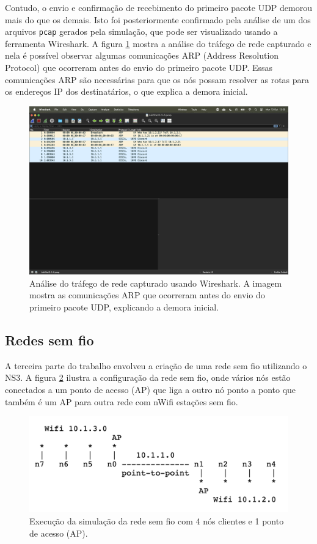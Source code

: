 \documentclass[12pt,a4paper]{article}
\begin{document}
Contudo, o envio e confirmação de recebimento do primeiro pacote UDP demorou mais do que os demais. Isto foi posteriormente confirmado pela análise de um dos arquivos \texttt{pcap} gerados pela simulação, que pode ser visualizado usando a ferramenta Wireshark. A figura \ref{fig:wireshark_analysis} mostra a análise do tráfego de rede capturado e nela é possível observar algumas comunicações ARP (Address Resolution Protocol) que ocorreram antes do envio do primeiro pacote UDP. Essas comunicações ARP são necessárias para que os nós possam resolver as rotas para os endereços IP dos destinatários, o que explica a demora inicial.

\begin{figure}
  \centering
  \includegraphics[width=1\textwidth]{wireshark_csma.png}
  \caption{Análise do tráfego de rede capturado usando Wireshark. A imagem mostra as comunicações ARP que ocorreram antes do envio do primeiro pacote UDP, explicando a demora inicial.}
  \label{fig:wireshark_analysis}
\end{figure}

\subsection{Redes sem fio}

A terceira parte do trabalho envolveu a criação de uma rede sem fio utilizando o NS3. A figura \ref{fig:wireless_topology} ilustra a configuração da rede sem fio, onde vários nós estão conectados a um ponto de acesso (AP) que liga a outro nó ponto a ponto que também é um AP para outra rede com nWifi estações sem fio.

\begin{figure}
  \centering
  \includegraphics[width=1\textwidth]{wireless_topology.png}
  \caption{Execução da simulação da rede sem fio com 4 nós clientes e 1 ponto de acesso (AP).}
  \label{fig:wireless_topology}
\end{figure}
\end{document}
